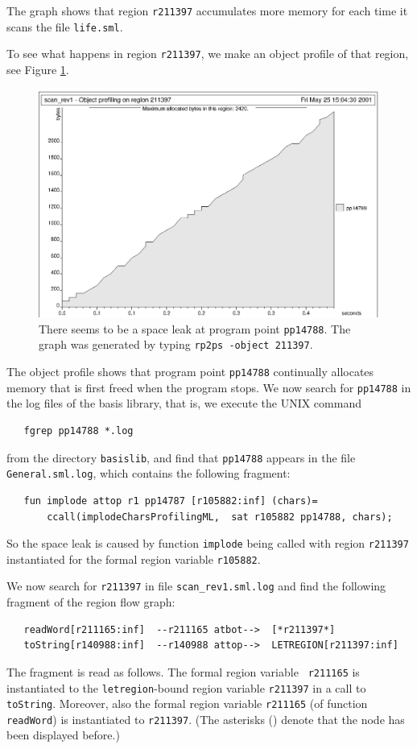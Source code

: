 \documentclass[12pt]{book}
\begin{document}
The graph shows that region \texttt{r211397} accumulates more memory
for each time it scans the file {\tt life.sml}.

To see what happens in region \texttt{r211397}, we make an object profile of
that region, see Figure \ref{scan_rev1_2.fig}.
\begin{figure}
\begin{center}
  \includegraphics{scan_rev1_2.ps}
\end{center}
\caption{There seems to be a space leak at program point
  \texttt{pp14788}. The graph was generated by typing \texttt{rp2ps
    -object 211397}.}
\label{scan_rev1_2.fig}
\end{figure}
The object profile shows that program point \texttt{pp14788}
continually allocates memory that is first freed when the program
stops. We now search for \texttt{pp14788} in the log files of the basis
library, that is, we execute the UNIX command
\begin{verbatim}
   fgrep pp14788 *.log
\end{verbatim}
from the directory {\tt basislib}, and find that {\tt pp14788}
appears in the file {\tt General.sml.log}, which contains the following
fragment:
\begin{verbatim}
   fun implode attop r1 pp14787 [r105882:inf] (chars)= 
       ccall(implodeCharsProfilingML,  sat r105882 pp14788, chars); 
\end{verbatim}
So the space leak is caused by function {\tt implode} being called
with region {\tt r211397} instantiated for the formal region variable
{\tt r105882}.

We now search for \texttt{r211397} in file \texttt{scan\_rev1.sml.log} and
find the following fragment of the region flow graph:
\begin{small}
\begin{verbatim}
   readWord[r211165:inf]  --r211165 atbot-->  [*r211397*]
   toString[r140988:inf]  --r140988 attop-->  LETREGION[r211397:inf]
\end{verbatim}
\end{small}
The fragment is read as follows. The formal region variable {\tt
  r211165} is instantiated to the {\tt letregion}-bound region variable
{\tt r211397} in a call to {\tt toString}. Moreover, also the formal
region variable {\tt r211165} (of function {\tt readWord}) is
instantiated to {\tt r211397}. (The asterisks ({\tt *}) denote that the
node has been displayed before.)
\end{document}
